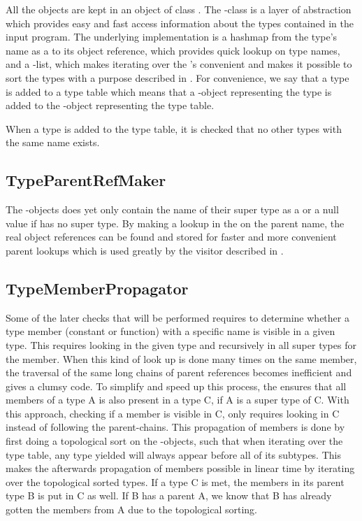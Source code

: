 All the  objects are kept in an object of class . The -class is a layer of abstraction which provides easy and fast access information about the types contained in the input program. The underlying implementation is a hashmap from the type's name as a  to its object reference, which provides quick lookup on type names, and a -list, which makes iterating over the 's convenient and makes it possible to sort the types with a purpose described in . For convenience, we say that a type is added to a type table which means that a -object representing the type is added to the -object representing the type table.

When a type is added to the type table, it is checked that no other types with the same name exists.

\subsection{TypeParentRefMaker}
\label{sec:TypeParentRefMaker}
The -objects does yet only contain the name of their super type as a  or a null value if has no super type. By making a lookup in the  on the parent name, the real object references can be found and stored for faster and more convenient parent lookups which is used greatly by the visitor described in .

\subsection{TypeMemberPropagator}
\label{sec:TypeMemberPropagator}
Some of the later checks that will be performed requires to determine whether a type member (constant or function) with a specific name is visible in a given type. This requires looking in the given type and recursively in all super types for the member. When this kind of look up is done many times on the same member, the traversal of the same long chains of parent references becomes inefficient and gives a clumsy code. To simplify and speed up this process, the  ensures that all members of a type A is also present in a type C, if A is a super type of C. With this approach, checking if a member is visible in C, only requires looking in C instead of following the parent-chains. This propagation of members is done by first doing a topological sort on the -objects, such that when iterating over the type table, any type yielded will always appear before all of its subtypes. This makes the afterwards propagation of members possible in linear time by iterating over the topological sorted types. If a type C is met, the members in its parent type B is put in C as well. If B has a parent A, we know that B has already gotten the members from A due to the topological sorting.



